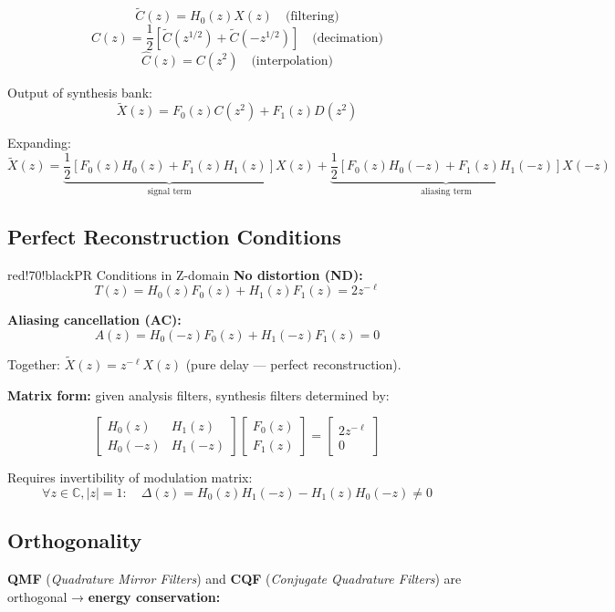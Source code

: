 \[
\tilde{C}(z) = H_0(z)X(z) \quad \text{(filtering)}
\]
\[
C(z) = \frac{1}{2}\left[\tilde{C}(z^{1/2}) + \tilde{C}(-z^{1/2})\right] \quad \text{(decimation)}
\]
\[
\hat{C}(z) = C(z^2) \quad \text{(interpolation)}
\]

Output of synthesis bank:
\[
\tilde{X}(z) = F_0(z)C(z^2) + F_1(z)D(z^2)
\]

Expanding:
\[
\tilde{X}(z) = \underbrace{\frac{1}{2}\left[F_0(z)H_0(z) + F_1(z)H_1(z)\right]}_{\text{signal term}} X(z) + \underbrace{\frac{1}{2}\left[F_0(z)H_0(-z) + F_1(z)H_1(-z)\right]}_{\text{aliasing term}} X(-z)
\]

\subsection{Perfect Reconstruction Conditions}

\begin{calloutbox}{red!70!black}{PR Conditions in Z-domain}
\textbf{No distortion (ND):}
\[
T(z) = H_0(z)F_0(z) + H_1(z)F_1(z) = 2z^{-\ell}
\]

\textbf{Aliasing cancellation (AC):}
\[
A(z) = H_0(-z)F_0(z) + H_1(-z)F_1(z) = 0
\]

Together: $\tilde{X}(z) = z^{-\ell}X(z)$ (pure delay — perfect reconstruction).
\end{calloutbox}

\textbf{Matrix form:} given analysis filters, synthesis filters determined by:

\[
\begin{bmatrix} H_0(z) & H_1(z) \\ H_0(-z) & H_1(-z) \end{bmatrix} \begin{bmatrix} F_0(z) \\ F_1(z) \end{bmatrix} = \begin{bmatrix} 2z^{-\ell} \\ 0 \end{bmatrix}
\]

Requires invertibility of modulation matrix:
\[
\forall z \in \mathbb{C}, |z|=1: \quad \Delta(z) = H_0(z)H_1(-z) - H_1(z)H_0(-z) \neq 0
\]

\subsection{Orthogonality}

\textbf{QMF} (\textit{Quadrature Mirror Filters}) and \textbf{CQF} (\textit{Conjugate Quadrature Filters}) are orthogonal → \textbf{energy conservation:}

